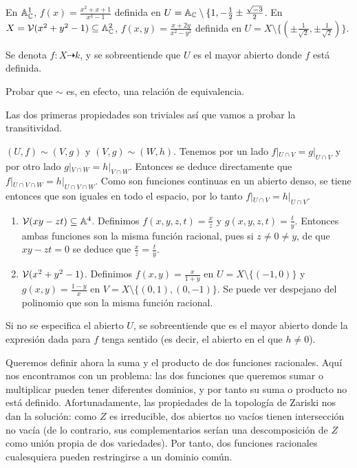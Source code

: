 \documentclass[ACGA.tex]{subfiles}
\begin{document}
\begin{ej}
En $\mathbb{A}^1_{\mathbb{C}}$, $f(x)=\frac{x^2+x+1}{x^3-1}$ definida en $U=\mathbb{A}_{\mathbb{C}}\setminus\{1,-\frac{1}{2}\pm\frac{\sqrt{-3}}{2}$. En $X=\mathcal{V}(x^2+y^2-1)\subseteq\mathbb{A}^2_{\mathbb{C}}$, $f(x,y)=\frac{x+2y}{x^2-y^2}$ definida en $U=X\setminus\{(\pm\frac{1}{\sqrt{2}},\pm\frac{1}{\sqrt{2}})\}$.
\end{ej}
\begin{nota}
Se denota $f: X\dashrightarrow k$, y se sobreentiende que $U$ es el mayor abierto donde $f$ está definida.
\end{nota}


\begin{ejer}
 Probar que $\sim$ es, en efecto, una relación de equivalencia.
\end{ejer}

\begin{solucion}
Las dos primeras propiedades son triviales así que vamos a probar la transitividad. 

$(U,f)\sim (V,g)$ y $(V,g)\sim (W,h)$. Tenemos por un lado $f|_{U\cap V}=g|_{U\cap V}$ y por otro lado $g|_{V\cap W}=h|_{V\cap W}$. Entonces se deduce directamente que $f|_{U\cap V\cap W}=h|_{U\cap V\cap W}$. Como son funciones continuas en un abierto denso, se tiene entonces que son iguales en todo el espacio, por lo tanto $f|_{U\cap V}=h|_{U\cap V}$.
\end{solucion}

\begin{ej}
\begin{enumerate}
\item $\mathcal{V}(xy-zt)\subseteq\mathbb{A}^4$. Definimos $f(x,y,z,t)=\frac{x}{z}$ y $g(x,y,z,t)=\frac{t}{y}$. Entonces ambas funciones son la misma función racional, pues si $z\neq 0\neq y$, de que $xy-zt=0$ se deduce que $\frac{x}{z}=\frac{t}{y}$. 
\item $\mathcal{V}(x^2+y^2-1)$. Definimos $f(x,y)=\frac{x}{1+y}$ en $U=X\setminus\{(-1,0)\}$ y $g(x,y)=\frac{1-y}{x}$ en $V=X\setminus\{(0,1),(0,-1)\}$. Se puede ver despejano del polinomio que son la misma función racional.
\end{enumerate}
\end{ej}

Si no se especifica el abierto $U$, se sobreentiende que es el mayor abierto donde la expresión dada para $f$ tenga sentido (es decir, el abierto en el que $h\neq 0$).


Queremos definir ahora la suma y el producto de dos funciones racionales. Aquí nos encontramos con un problema: las dos funciones que queremos sumar o multiplicar pueden tener diferentes dominios, y por tanto su suma o producto no está definido. Afortunadamente, las propiedades de la topología de Zariski nos dan la solución: como $Z$ es irreducible, dos abiertos no vacíos tienen intersección no vacía (de lo contrario, sus complementarios serían una descomposición de $Z$ como unión propia de dos variedades). Por tanto, dos funciones racionales cualesquiera pueden restringirse a un dominio común. 
\end{document}
